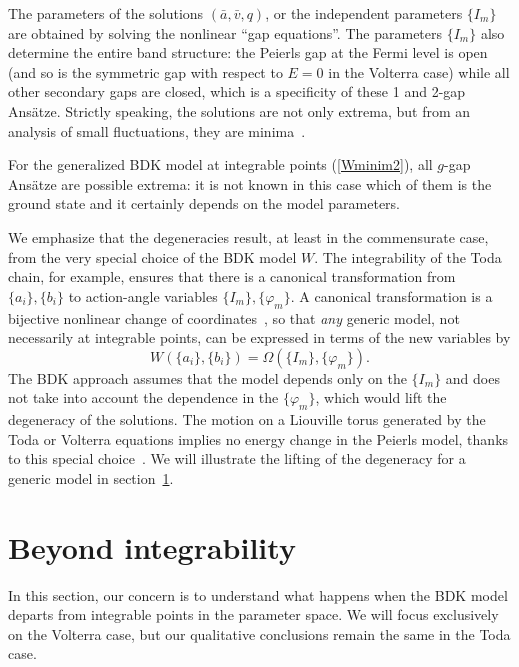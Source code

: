 \documentclass[]{revtex4-1}
\begin{document}
The parameters of the solutions $(\bar{a},\bar{v},q)$, or the independent parameters $\{I_m\}$ are obtained by solving the nonlinear ``gap equations''. The parameters $\{I_m\}$ also determine the entire band structure: the Peierls gap at the Fermi level is open (and so is the symmetric gap with respect to $E=0$ in the Volterra case) while all other secondary gaps are closed, which is a specificity of these 1 and 2-gap Ans\"atze.
  Strictly speaking, the solutions are not only extrema, but from an analysis of small fluctuations, they are minima~\cite{DK2}.

For the generalized BDK model at integrable points (\ref{Wminim2}), all $g$-gap Ans\"atze are possible extrema: it is not known in this case which of them is the ground state and it certainly depends on the model parameters.


 We emphasize that the degeneracies result, at least in the commensurate case, from the very special choice of the BDK model $W$. The integrability of the Toda chain, for example, ensures that there is a canonical transformation  from $\{a_i\}, \{b_i\}$ to action-angle variables $\{I_m\}, \{\varphi_m\}$. A canonical transformation is a bijective nonlinear change of coordinates~\cite{arnold}, so that \textit{any} generic model, not necessarily at integrable points, can be expressed in terms of the new variables by
 \begin{equation} W(\{a_i\},\{b_i\})=\Omega(\{I_m\},\{\varphi_m\}). \label{gentrans} \end{equation}
 The BDK approach assumes that the model depends only on the $\{I_m\}$ and does not take into account the dependence in the $\{\varphi_m \}$, which would lift the degeneracy of the solutions. The motion on a Liouville torus generated by the Toda or Volterra equations implies no energy change in the Peierls model, thanks to this special choice~\cite{noteintegrablemodel}. We will illustrate the lifting of the degeneracy for a generic model in section~\ref{Volterrasimplest}.

 \section{Beyond integrability}
 \label{Volterrasimplest}


In this section, our concern is to understand
what happens when the BDK model departs from integrable points in the parameter space.  We will focus exclusively on the Volterra case, but our qualitative conclusions remain the same in the Toda case.
\end{document}
